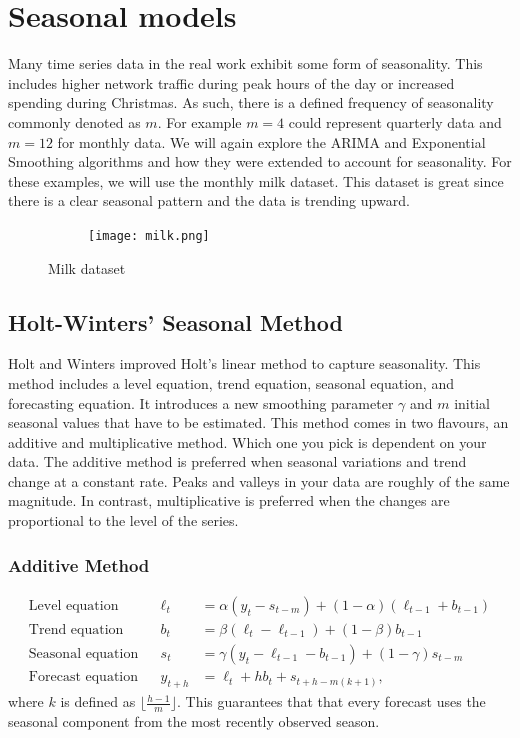 \documentclass{article}
\begin{document}
  \newpage

  \section{Seasonal models}
  Many time series data in the real work exhibit some form of seasonality. This includes higher network traffic during peak hours of the day or increased spending during Christmas. As such, there is a defined frequency of seasonality commonly denoted as $m$. For example $m=4$ could represent quarterly data and $m=12$ for monthly data. We will again explore the ARIMA and Exponential Smoothing algorithms and how they were extended to account for seasonality. For these examples, we will use the monthly milk dataset. This dataset is great since there is a clear seasonal pattern and the data is trending upward.
  \begin{figure}[H]
    \centering
    \captionsetup{justification=centering}
    \begin{subfigure}[b]{\linewidth}
      \texttt{[image: milk.png]}
    \end{subfigure}
    \caption{Milk dataset}
  \end{figure}

  \newpage
  \subsection{Holt-Winters' Seasonal Method}
  Holt and Winters improved Holt's linear method to capture seasonality. This method includes a level equation, trend equation, seasonal equation, and forecasting equation. It introduces a new smoothing parameter $\gamma$ and $m$ initial seasonal values that have to be estimated. This method comes in two flavours, an additive and multiplicative method. Which one you pick is dependent on your data. The additive method is preferred when seasonal variations and trend change at a constant rate. Peaks and valleys in your data are roughly of the same magnitude. In contrast, multiplicative is preferred when the changes are proportional to the level of the series. 

  \subsubsection{Additive Method}
  \begin{align*}
    \text{Level equation}   &&\ell_{t} &= \alpha(y_{t} - s_{t-m}) + (1 - \alpha)(\ell_{t-1} + b_{t-1})\\
    \text{Trend equation}   &&b_{t} &= \beta(\ell_{t} - \ell_{t-1}) + (1 - \beta)b_{t-1}\\
    \text{Seasonal equation}   &&s_{t} &= \gamma (y_{t}-\ell_{t-1}-b_{t-1}) + (1-\gamma)s_{t-m}\\
    \text{Forecast equation}   && \hat{y}_{t+h} &= \ell_{t} + hb_{t} + s_{t+h-m(k+1)},
  \end{align*}
  where $k$ is defined as $\lfloor\frac{h-1}{m}\rfloor$. This guarantees that that every forecast uses the seasonal component from the most recently observed season. 
\end{document}
